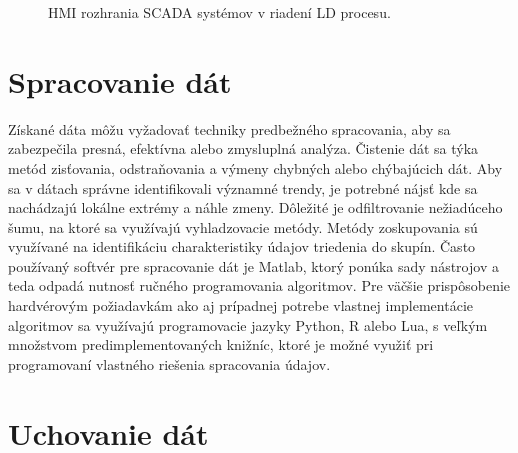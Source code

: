 \documentclass[]{tukediphc}
\begin{document}
\begin{figure}[!ht]
	\centering
	\qquad
	\caption{HMI rozhrania SCADA systémov v riadení LD procesu.}
\end{figure}

\section{Spracovanie dát}

Získané dáta môžu vyžadovať techniky predbežného spracovania, aby sa zabezpečila presná, efektívna alebo zmysluplná analýza. Čistenie dát sa týka metód zisťovania, odstraňovania a výmeny chybných alebo chýbajúcich dát. Aby sa v dátach správne identifikovali významné trendy, je potrebné nájsť kde sa nachádzajú lokálne extrémy a náhle zmeny. Dôležité je odfiltrovanie nežiadúceho šumu, na ktoré sa využívajú vyhladzovacie metódy. Metódy zoskupovania sú využívané na identifikáciu charakteristiky údajov triedenia do skupín. Často používaný softvér pre spracovanie dát je Matlab, ktorý ponúka sady nástrojov a teda odpadá nutnosť ručného programovania algoritmov. Pre väčšie prispôsobenie hardvérovým požiadavkám ako aj prípadnej potrebe vlastnej implementácie algoritmov sa využívajú programovacie jazyky Python, R alebo Lua, s veľkým množstvom predimplementovaných knižníc, ktoré je možné využiť pri programovaní vlastného riešenia spracovania údajov.

\section{Uchovanie dát}
\end{document}
